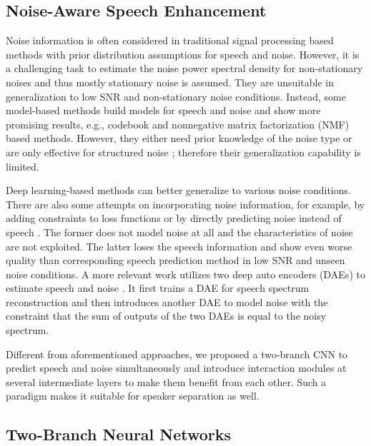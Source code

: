 \documentclass[letterpaper]{article} \usepackage{snnet}  \usepackage{times}  \usepackage{helvet} \usepackage{courier}  \usepackage[hyphens]{url}  \usepackage{graphicx} \urlstyle{rm} \def\UrlFont{\rm}  \usepackage{graphicx}  \usepackage{natbib}  \usepackage{caption} \usepackage{amsfonts}  \usepackage{amsmath}  \usepackage{multirow} \usepackage{tablefootnote}  \usepackage[switch]{lineno}
\begin{document}
\subsection{Noise-Aware Speech Enhancement}

\noindent Noise information is often considered in traditional signal processing based methods \cite{boll1979suppression, hendriks2010noisePSD, wang2017model} with prior distribution assumptions for speech and noise. However, it is a challenging task to estimate the noise power spectral density for non-stationary noises and thus mostly stationary noise is assumed. They are unsuitable in generalization to low SNR and non-stationary noise conditions. Instead, some model-based methods build models for speech and noise and show more promising results, e.g., codebook \cite{srinivasan2006Codebook, srinivasan2005Codebook} and nonnegative matrix factorization (NMF) \cite{wilson2008NMF1, moham2013NMF2} based methods. However, they either need prior knowledge of the noise type \cite{srinivasan2006Codebook, srinivasan2005Codebook} or are only effective for structured noise \cite{wilson2008NMF1, moham2013NMF2}; therefore their generalization capability is limited.

Deep learning-based methods can better generalize to various noise conditions. There are also some attempts on incorporating noise information, for example, by adding constraints to loss functions \cite{fan2019noise, xu2020using, xia2020weighted} or by directly predicting noise instead of speech \cite{odelowo2017noise, odelowo2018study}. The former does not model noise at all and the characteristics of noise are not exploited. The latter loses the speech information and show even worse quality than corresponding speech prediction method in low SNR and unseen noise conditions. A more relevant work utilizes two deep auto encoders (DAEs) to estimate speech and noise \cite{sun2015unseen} . It first trains a DAE for speech spectrum reconstruction and then introduces another DAE to model noise with the constraint that the sum of outputs of the two DAEs is equal to the noisy spectrum.

Different from aforementioned approaches, we proposed a two-branch CNN to predict speech and noise simultaneously and introduce interaction modules at several intermediate layers to make them benefit from each other. Such a paradigm makes it suitable for speaker separation as well. 

\subsection{Two-Branch Neural Networks}
\end{document}
